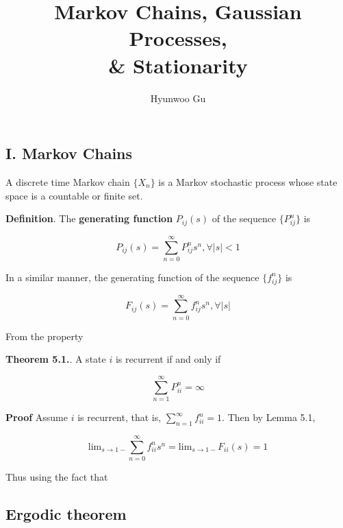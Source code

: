 \documentclass[12pt]{article}
\theoremstyle{nonumberbreak}
\begin{document}
\title{\textbf{Markov Chains, Gaussian Processes, \\ \& Stationarity}}
\author{Hyunwoo Gu}
\date{}

\maketitle


\begin{center}
\section*{I. Markov Chains}
\end{center}
\setcounter{section}{1}

A discrete time Markov chain $\{ X_n \}$ is a Markov stochastic process whose state space is a countable or finite set. 



\begin{theorem}
\textbf{Definition}. The \textbf{generating function} $P_{ij}(s)$ of the sequence $\{ P_{ij}^n \}$ is 

$$
P_{ij} (s) = \sum_{n=0}^\infty P_{ij}^n s^n, \forall |s|<1
$$

In a similar manner, the generating function of the sequence $\{ f_{ij}^n \}$ is 

$$
F_{ij}(s) = \sum_{n=0}^\infty f_{ij}^n s^n, \forall |s|
$$
\end{theorem}

From the property 


\begin{theorem}
\textbf{Theorem 5.1.}. A state $i$ is recurrent if and only if 

$$
\sum_{n=1}^\infty P_{ii}^n = \infty
$$
\end{theorem}


\textbf{Proof} Assume $i$ is recurrent, that is, $\sum_{n=1}^\infty f_{ii}^n = 1$. Then by Lemma 5.1,

$$
\mathrm{lim}_{s \to 1-} \sum_{n=0}^\infty f_{ii}^n s^n = \mathrm{lim}_{s \to 1-} F_{ii}(s) = 1
$$

Thus using the fact that 




\subsection{Ergodic theorem}
\end{document}
